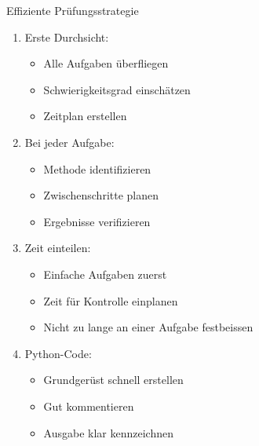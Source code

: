 \begin{KR}{Effiziente Prüfungsstrategie}
\begin{enumerate}
    \item Erste Durchsicht:
    \begin{itemize}
        \item Alle Aufgaben überfliegen
        \item Schwierigkeitsgrad einschätzen
        \item Zeitplan erstellen
    \end{itemize}
    
    \item Bei jeder Aufgabe:
    \begin{itemize}
        \item Methode identifizieren
        \item Zwischenschritte planen
        \item Ergebnisse verifizieren
    \end{itemize}
    
    \item Zeit einteilen:
    \begin{itemize}
        \item Einfache Aufgaben zuerst
        \item Zeit für Kontrolle einplanen
        \item Nicht zu lange an einer Aufgabe festbeissen
    \end{itemize}
    
    \item Python-Code:
    \begin{itemize}
        \item Grundgerüst schnell erstellen
        \item Gut kommentieren
        \item Ausgabe klar kennzeichnen
    \end{itemize}
\end{enumerate}
\end{KR}

